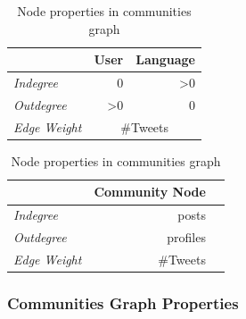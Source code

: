 \documentclass{llncs}
\begin{document}
\begin{table}[!h]
\centering
\begin{minipage}{.4\textwidth}
\caption{Node properties in\newline user graph}
\begin{tabular}{@{}lrr@{}}
\toprule
\textbf{}& \textbf{User} & \textbf{Language} \\ \midrule
{\emph{Indegree}} & 0 & \textgreater0 \\
{\emph{Outdegree}} & \textgreater0 & 0 \\ 
{\emph{Edge Weight}}& \multicolumn{2}{c}{\#Tweets}\\ \bottomrule
\end{tabular}
\label{tbl:usersgraph}
\end{minipage}
\begin{minipage}{.4\textwidth}
\caption{Node properties in communities graph}
\begin{tabular}{@{}lrr@{}}
\toprule
\textbf{}& \textbf{Community Node} \\ \midrule
{\emph{Indegree}} &  posts\\
{\emph{Outdegree}} & profiles \\ 
{\emph{Edge Weight}}& \#Tweets\\ \bottomrule
\end{tabular}
\label{tbl:communitiesgraph}
\end{minipage}
\end{table}



\subsubsection{Communities Graph Properties}
\end{document}
